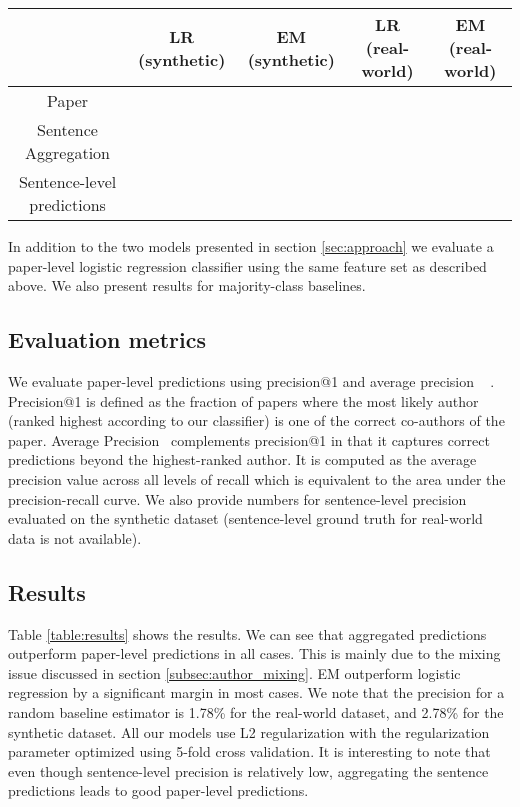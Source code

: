 
\begin{table*}[htdp!]
\begin{center}
\begin{tabular}{|c|c|c|c|c|}
\hline
& LR (synthetic) & EM (synthetic)  & LR (real-world) & EM (real-world) \\ \hline
Paper & & & & \\ \hline
Sentence Aggregation & & & &  \\ \hline
Sentence-level predictions & & & &  \\ \hline
\end{tabular}
\end{center}
\caption{Precision for evaluating Logistic Regression and Expectation Maximization models on synthetic and real-world datasets using different classification approaches}
\label{table:results}
\end{table*}%

In addition to the two models presented in section \ref{sec:approach} we evaluate a paper-level logistic regression classifier using the same feature set as described above. We also present results for majority-class baselines. 

\subsection{Evaluation metrics}

We evaluate paper-level predictions using precision@1 and average precision ~\cite{manning2008introduction} . Precision@1 is defined as the fraction of papers where the most likely author (ranked highest according to our classifier) is one of the correct co-authors of the paper. 
Average Precision~\cite{manning2008introduction} complements precision@1 in that it captures correct predictions beyond the highest-ranked author.
It is computed as the average precision value across all levels of recall which is equivalent to the area under the precision-recall curve.
We also provide numbers for sentence-level precision evaluated on the synthetic dataset (sentence-level ground truth for real-world data is not available).

\subsection{Results}

Table \ref{table:results} shows the results. We can see that aggregated predictions outperform paper-level predictions in all cases. This is mainly due to the mixing issue discussed in section \ref{subsec:author_mixing}. EM outperform logistic regression by a significant margin in most cases. We note that the precision for a random baseline estimator is 1.78\% for the real-world dataset, and 2.78\% for the synthetic dataset. All our models use L2 regularization with the regularization parameter optimized using 5-fold cross validation. It is interesting to note that even though sentence-level precision is relatively low, aggregating the sentence predictions leads to good paper-level predictions.

